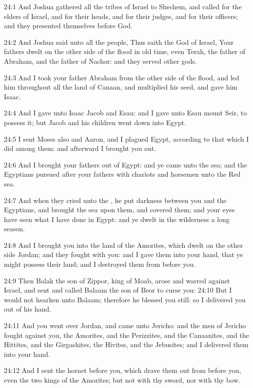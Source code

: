 24:1 And Joshua gathered all the tribes of Israel to Shechem, and
called for the elders of Israel, and for their heads, and for their
judges, and for their officers; and they presented themselves before
God.

24:2 And Joshua said unto all the people, Thus saith the \LORD God of
Israel, Your fathers dwelt on the other side of the flood in old time,
even Terah, the father of Abraham, and the father of Nachor: and they
served other gods.

24:3 And I took your father Abraham from the other side of the flood,
and led him throughout all the land of Canaan, and multiplied his
seed, and gave him Isaac.

24:4 And I gave unto Isaac Jacob and Esau: and I gave unto Esau mount
Seir, to possess it; but Jacob and his children went down into Egypt.

24:5 I sent Moses also and Aaron, and I plagued Egypt, according to
that which I did among them: and afterward I brought you out.

24:6 And I brought your fathers out of Egypt: and ye came unto the
sea; and the Egyptians pursued after your fathers with chariots and
horsemen unto the Red sea.

24:7 And when they cried unto the \LORD, he put darkness between you
and the Egyptians, and brought the sea upon them, and covered them;
and your eyes have seen what I have done in Egypt: and ye dwelt in the
wilderness a long season.

24:8 And I brought you into the land of the Amorites, which dwelt on
the other side Jordan; and they fought with you: and I gave them into
your hand, that ye might possess their land; and I destroyed them from
before you.

24:9 Then Balak the son of Zippor, king of Moab, arose and warred
against Israel, and sent and called Balaam the son of Beor to curse
you: 24:10 But I would not hearken unto Balaam; therefore he blessed
you still: so I delivered you out of his hand.

24:11 And you went over Jordan, and came unto Jericho: and the men of
Jericho fought against you, the Amorites, and the Perizzites, and the
Canaanites, and the Hittites, and the Girgashites, the Hivites, and
the Jebusites; and I delivered them into your hand.

24:12 And I sent the hornet before you, which drave them out from
before you, even the two kings of the Amorites; but not with thy
sword, nor with thy bow.

